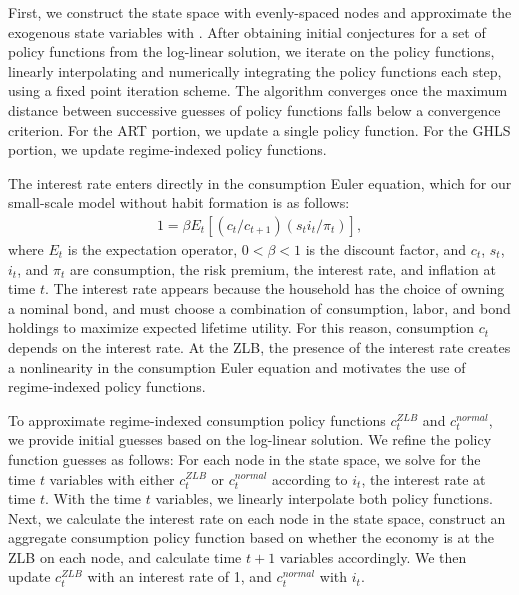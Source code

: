 \documentclass[12pt, final]{article}
\begin{document}
First, we construct the state space with evenly-spaced nodes and approximate the exogenous state variables with \hyperlink{Rouwenhorst}{\color{black}{Rouwenhorst (1995)}}. After obtaining initial conjectures for a set of policy functions from the log-linear solution, we iterate on the policy functions, linearly interpolating and numerically integrating the policy functions each step, using a fixed point iteration scheme. The algorithm converges once the maximum distance between successive guesses of policy functions falls below a convergence criterion. For the ART portion, we update a single policy function. For the GHLS portion, we update regime-indexed policy functions.

The interest rate enters directly in the consumption Euler equation, which for our small-scale model without habit formation is as follows:
\begin{gather*}
    1 = \beta E_t[(c_t/c_{t+1})(s_ti_t/\pi_{t})],
\end{gather*}
where $E_t$ is the expectation operator, $0<\beta<1$ is the discount factor, and $c_t$, $s_t$, $i_t$, and $\pi_t$ are consumption, the risk premium, the interest rate, and inflation at time $t$. The interest rate appears because the household has the choice of owning a nominal bond, and must choose a combination of consumption, labor, and bond holdings to maximize expected lifetime utility. For this reason, consumption $c_t$ depends on the interest rate. At the ZLB, the presence of the interest rate creates a nonlinearity in the consumption Euler equation and motivates the use of regime-indexed policy functions. 

To approximate regime-indexed consumption policy functions $c_t^{ZLB}$ and $c_t^{normal}$, we provide initial guesses based on the log-linear solution. We refine the policy function guesses as follows: For each node in the state space, we solve for the time $t$ variables with either $c_t^{ZLB}$  or $c_t^{normal}$ according to $i_t$, the interest rate at time $t$. With the time $t$ variables, we linearly interpolate both policy functions. Next, we calculate the interest rate on each node in the state space, construct an aggregate consumption policy function based on whether the economy is at the ZLB on each node, and calculate time $t+1$ variables accordingly. We then update $c_t^{ZLB}$ with an interest rate of 1, and $c_t^{normal}$ with $i_t$.

\end{document}
